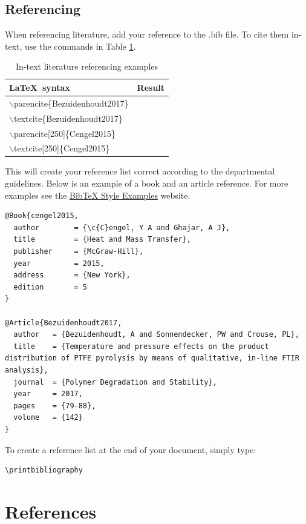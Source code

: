 \documentclass[a4paper,12pt]{article}
\begin{document}
\subsection{Referencing}


When referencing literature, add your reference to the .bib file. To cite them in-text, use the commands in Table \ref{tab:Cite}.

\begin{table}[!ht]
\centering
\caption{In-text literature referencing examples}
\label{tab:Cite}
\begin{tabular}{ll}
\toprule
\LaTeX\ syntax & Result\\
\midrule
$\backslash$parencite\{Bezuidenhoudt2017\} &\parencite{Bezuidenhoudt2017} \\
$\backslash$textcite\{Bezuidenhoudt2017\} & \textcite{Bezuidenhoudt2017} \\
$\backslash$parencite[250]\{Cengel2015\} &\parencite[250]{Cengel2015} \\
$\backslash$textcite[250]\{Cengel2015\} & \textcite[250]{Cengel2015} \\
\bottomrule
\end{tabular}
\end{table}

This will create your reference list correct according to the departmental guidelines. Below is an example of a book and an article reference. For more examples see the \href{https://www.verbosus.com/bibtex-style-examples.html}{BibTeX Style Examples} website. 

\begin{lstlisting}
@Book{cengel2015,
  author		= {\c{C}engel, Y A and Ghajar, A J},
  title			= {Heat and Mass Transfer},
  publisher		= {McGraw-Hill},
  year			= 2015,
  address		= {New York},
  edition		= 5
}

@Article{Bezuidenhoudt2017,
  author   = {Bezuidenhoudt, A and Sonnendecker, PW and Crouse, PL},
  title	   = {Temperature and pressure effects on the product distribution of PTFE pyrolysis by means of qualitative, in-line FTIR analysis},
  journal  = {Polymer Degradation and Stability},
  year	   = 2017,
  pages	   = {79-88},
  volume   = {142}
}
\end{lstlisting}

To create a reference list at the end of your document, simply type: 
\begin{lstlisting}
\printbibliography
\end{lstlisting} 
\nocite{*}

\section{References}
\printbibliography[heading=none]
\end{document}
